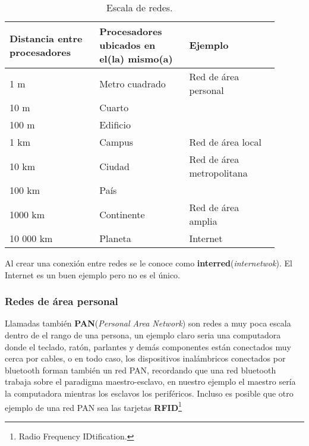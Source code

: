 \documentclass[
	11pt, %
	fleqn, %
	a4paper, %
]{LegrandOrangeBook}
\begin{document}
\begin{table}[H]
\begin{tabular}{|m{0.3\linewidth}|m{0.3\linewidth}|m{0.3\linewidth}|}
\hline
\rowcolor[HTML]{9698ED} 
Distancia entre procesadores & Procesadores ubicados en el(la) mismo(a) & Ejemplo                              \\ \hline
1 m                          & Metro cuadrado                           & Red de área personal                 \\ \hline
10 m                         & Cuarto                                   &                                      \\ \cline{1-2}
100 m                        & Edificio                                 &                                      \\ \cline{1-2}
1 km                         & Campus                                   & \multirow{-3}{*}{Red de área local}  \\ \hline
10 km                        & Ciudad                                   & Red de área metropolitana            \\ \hline
100 km                       & País                                     &                                      \\ \cline{1-2}
1000 km                      & Continente                               & \multirow{-2}{*}{Red de área amplia} \\ \hline
10 000 km                    & Planeta                                  & Internet                             \\ \hline
\end{tabular}
\caption{Escala de redes.}
\end{table}
Al crear una conexión entre redes se le conoce como \textbf{interred}(\textit{internetwok}). El Internet es un buen ejemplo pero no es el único.
\subsubsection{Redes de área personal}
Llamadas también \textbf{PAN}(\textit{Personal Area Network}) son redes a muy poca escala dentro de el rango de una persona, un ejemplo claro seria una computadora donde el teclado, ratón, parlantes y demás componentes están conectados muy cerca por cables, o en todo caso, los dispositivos inalámbricos conectados por bluetooth forman también un red PAN, recordando que una red bluetooth trabaja sobre el paradigma maestro-esclavo, en nuestro ejemplo el maestro sería la computadora mientras los esclavos los periféricos. Incluso es posible que otro ejemplo de una red PAN sea las tarjetas \textbf{RFID}\footnote{Radio Frequency IDtification.}
\end{document}

